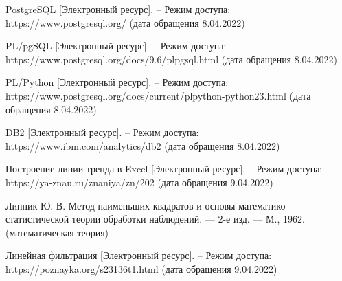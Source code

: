 \documentclass[a4paper,14pt]{extreport}
\begin{document}
\begin{thebibliography}{3}
	 PostgreSQL [Электронный ресурс]. -- Режим доступа: https://www.postgresql.org/ (дата обращения 8.04.2022)
	
	 PL/pgSQL [Электронный ресурс]. -- Режим доступа: https://www.postgresql.org/docs/9.6/plpgsql.html (дата обращения 8.04.2022)
	
	 PL/Python [Электронный ресурс]. -- Режим доступа: https://www.postgresql.org/docs/current/plpython-python23.html (дата обращения 8.04.2022)
	
	 DB2 [Электронный ресурс]. -- Режим доступа: https://www.ibm.com/analytics/db2 (дата обращения 8.04.2022)
	
	 Построение линии тренда в Excel [Электронный ресурс]. -- Режим доступа: https://ya-znau.ru/znaniya/zn/202 (дата обращения 9.04.2022)
	
	 Линник Ю. В. Метод наименьших квадратов и основы математико-статистической теории обработки наблюдений. — 2-е изд. — М., 1962. (математическая теория)
	
	 Линейная фильтрация [Электронный ресурс]. -- Режим доступа: https://poznayka.org/s23136t1.html (дата обращения 9.04.2022)
\end{thebibliography}
	
\end{document}
